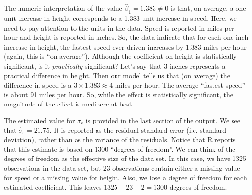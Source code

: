 The numeric interpretation of the value $\hat{\beta}_1 = 1.383 \neq 0$
is that, on average, a one-unit increase in height corresponds to a
1.383-unit increase in speed.  Here, we need to pay attention to the
units in the data. Speed is reported in miles per hour and height is
reported in inches. So, the data indicate that for each one inch
increase in height, the fastest speed ever driven increases by 1.383
miles per hour (again, this is ``on average''). Although the
coefficient on height is statistically significant, is it
\emph{practically} significant? Let's say that 3 inches represents a
practical difference in height. Then our model tells us that (on
average) the difference in speed is a $3 \times 1.383 \approx 4$ miles
per hour.  The average ``fastest speed'' is about 91 miles per hour.
So, while the effect is statistically significant, the magnitude of
the effect is mediocre at best.

The estimated value for $\sigma_{\epsilon}$ is provided in the
last section of the output. We see that $\hat{\sigma}_{\epsilon} = 21.75$.
It is reported as the residual standard error (i.e. standard deviation), 
rather than as the variance
of the residuals. Notice that R reports that this estimate is based on
\num{1300} ``degrees of freedom''. We can think of the degrees of freedom
as the effective size of the data set. In this case, we have \num{1325}
observations in the data set, but 23 observations contain either a missing
value for speed or a missing value for height. Also, we lose a 
degree of freedom for each estimated coefficient. This leaves
$\num{1325} - 23 - 2 = \num{1300}$ degrees of freedom.

